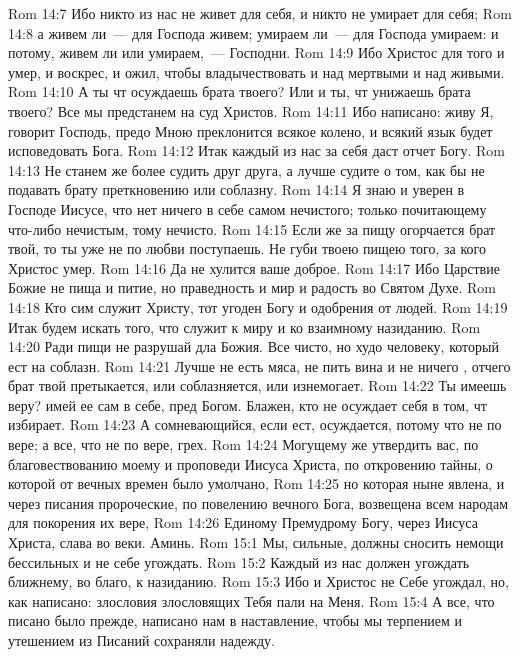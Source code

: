 \vs Rom 14:7 Ибо никто из нас не живет для себя, и никто не умирает для себя;
\vs Rom 14:8 а живем ли~--- для Господа живем; умираем ли~--- для Господа умираем: и потому, живем ли или умираем,~---  Господни.
\vs Rom 14:9 Ибо Христос для того и умер, и воскрес, и ожил, чтобы владычествовать и над мертвыми и над живыми.
\vs Rom 14:10 А ты чт осуждаешь брата твоего? Или и ты, чт унижаешь брата твоего? Все мы предстанем на суд Христов.
\vs Rom 14:11 Ибо написано: живу Я, говорит Господь, предо Мною преклонится всякое колено, и всякий язык будет исповедовать Бога.
\vs Rom 14:12 Итак каждый из нас за себя даст отчет Богу.
\rsbpar\vs Rom 14:13 Не станем же более судить друг друга, а лучше судите о том, как бы не подавать брату  преткновению или соблазну.
\vs Rom 14:14 Я знаю и уверен в Господе Иисусе, что нет ничего в себе самом нечистого; только почитающему что-либо нечистым, тому нечисто.
\vs Rom 14:15 Если же за пищу огорчается брат твой, то ты уже не по любви поступаешь. Не губи твоею пищею того, за кого Христос умер.
\vs Rom 14:16 Да не хулится ваше доброе.
\vs Rom 14:17 Ибо Царствие Божие не пища и питие, но праведность и мир и радость во Святом Духе.
\vs Rom 14:18 Кто сим служит Христу, тот угоден Богу и  одобрения от людей.
\vs Rom 14:19 Итак будем искать того, что служит к миру и ко взаимному назиданию.
\vs Rom 14:20 Ради пищи не разрушай дла Божия. Все чисто, но худо человеку, который ест на соблазн.
\vs Rom 14:21 Лучше не есть мяса, не пить вина и не  ничего , отчего брат твой претыкается, или соблазняется, или изнемогает.
\vs Rom 14:22 Ты имеешь веру? имей ее сам в себе, пред Богом. Блажен, кто не осуждает себя в том, чт избирает.
\vs Rom 14:23 А сомневающийся, если ест, осуждается, потому что не по вере; а все, что не по вере, грех.
\vs Rom 14:24 Могущему же утвердить вас, по благовествованию моему и проповеди Иисуса Христа, по откровению тайны, о которой от вечных времен было умолчано,
\vs Rom 14:25 но которая ныне явлена, и через писания пророческие, по повелению вечного Бога, возвещена всем народам для покорения их вере,
\vs Rom 14:26 Единому Премудрому Богу, через Иисуса Христа, слава во веки. Аминь.
\vs Rom 15:1 Мы, сильные, должны сносить немощи бессильных и не себе угождать.
\vs Rom 15:2 Каждый из нас должен угождать ближнему, во благо, к назиданию.
\vs Rom 15:3 Ибо и Христос не Себе угождал, но, как написано: злословия злословящих Тебя пали на Меня.
\vs Rom 15:4 А все, что писано было прежде, написано нам в наставление, чтобы мы терпением и утешением из Писаний сохраняли надежду.
